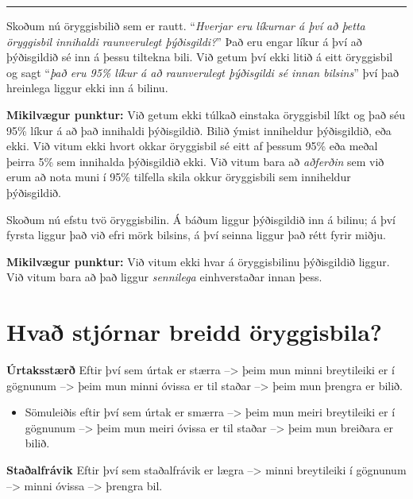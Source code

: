 \documentclass[
]{book}
\providecommand{\tightlist}{%
  \setlength{\itemsep}{0pt}\setlength{\parskip}{0pt}}
\begin{document}
\begin{center}\rule{0.5\linewidth}{0.5pt}\end{center}

Skoðum nú öryggisbilið sem er rautt. ``\emph{Hverjar eru líkurnar á því að þetta öryggisbil innihaldi raunverulegt þýðisgildi?}'' Það eru engar líkur á því að þýðisgildið sé inn á þessu tiltekna bili. Við getum því ekki litið á eitt öryggisbil og sagt ``\emph{það eru 95\% líkur á að raunverulegt þýðisgildi sé innan bilsins}'' því það hreinlega liggur ekki inn á bilinu.

\textbf{Mikilvægur punktur:} Við getum ekki túlkað einstaka öryggisbil líkt og það séu 95\% líkur á að það innihaldi þýðisgildið. Bilið ýmist inniheldur þýðisgildið, eða ekki. Við vitum ekki hvort okkar öryggisbil sé eitt af þessum 95\% eða meðal þeirra 5\% sem innihalda þýðisgildið ekki. Við vitum bara að \emph{aðferðin} sem við erum að nota muni í 95\% tilfella skila okkur öryggisbili sem inniheldur þýðisgildið.

Skoðum nú efstu tvö öryggisbilin. Á báðum liggur þýðisgildið inn á bilinu; á því fyrsta liggur það við efri mörk bilsins, á því seinna liggur það rétt fyrir miðju.

\textbf{Mikilvægur punktur:} Við vitum ekki hvar á öryggisbilinu þýðisgildið liggur. Við vitum bara að það liggur \emph{sennilega} einhverstaðar innan þess.

\hypertarget{hvauxf0-stjuxf3rnar-breidd-uxf6ryggisbila}{%
\section{Hvað stjórnar breidd öryggisbila?}\label{hvauxf0-stjuxf3rnar-breidd-uxf6ryggisbila}}

\textbf{Úrtaksstærð} Eftir því sem úrtak er stærra --\textgreater{} þeim mun minni breytileiki er í gögnunum --\textgreater{} þeim mun minni óvissa er til staðar --\textgreater{} þeim mun þrengra er bilið.

\begin{itemize}
\tightlist
\item
  Sömuleiðis eftir því sem úrtak er smærra --\textgreater{} þeim mun meiri breytileiki er í gögnunum --\textgreater{} þeim mun meiri óvissa er til staðar --\textgreater{} þeim mun breiðara er bilið.
\end{itemize}

\textbf{Staðalfrávik} Eftir því sem staðalfrávik er lægra --\textgreater{} minni breytileiki í gögnunum --\textgreater{} minni óvissa --\textgreater{} þrengra bil.
\end{document}
